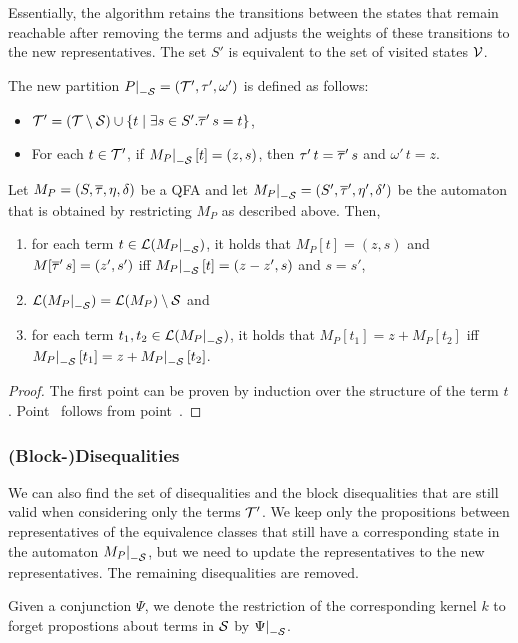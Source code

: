 Essentially, the algorithm retains the transitions between the states that remain reachable after removing the terms and adjusts the weights of these transitions to the new representatives.
The set $S'$ is equivalent to the set of visited states $\mathcal{V}$.

The new partition $\restr{P}{-\Set} = (\T', \tau', \omega')$ is defined as follows:
\begin{itemize}
    \item $\mathcal{T}' = (\mathcal{T} \setminus \mathcal{S}) \cup \{t \mid \exists s \in S' . \overline{\tau}'\,s = t\}$,
    \item For each $t \in \mathcal{T}'$, if $\restr{M_P}{-\Set}[t] = (z, s)$, then $\tau'\,t = \overline{\tau}'\,s$ and $\omega'\,t = z$.
\end{itemize}

\begin{theorem}\label{restriction}
    Let $M_P = (S, \overline{\tau}, \eta, \delta)$ be a QFA and let $\restr{M_P}{-\Set} = (S', \otau', \eta', \delta')$ be the automaton that is obtained by restricting $M_P$ as described above.
    Then,
    \begin{enumerate}
        \item\label{item:lemma-restriction} for each term $t \in \L(\restr{M_P}{-\Set})$, it holds that $M_P[t] = (z, s)$ and $M[\overline{\tau}'\,s] = (z', s')$ iff $\restr{M_P}{-\Set}[t] = (z - z', s)$ and $s = s'$,
        \item $\L(\restr{M_P}{-\Set}) = \L(M_P) \setminus \Set$ and
              \item\label{item:correctness-restriction} for each term $t_1, t_2 \in \L(\restr{M_P}{-\Set})$, it holds that $M_P[t_1] = z + M_P[t_2]$ iff $\restr{M_P}{-\Set}[t_1] = z + \restr{M_P}{-\Set}[t_2]$.
    \end{enumerate}
\end{theorem}
\begin{proof}
    The first point can be proven by induction over the structure of the term $t$.
    Point~ follows from point~.
\end{proof}
\subsubsection{(Block-)Disequalities}
We can also find the set of disequalities and the block disequalities that are still valid when considering only the terms $\mathcal{T}'$.
We keep only the propositions between representatives of the equivalence classes that
still have a corresponding state in the automaton $\restr{M_P}{-\Set}$, but we need to update the representatives to the new representatives.
The remaining disequalities are removed.

Given a conjunction $\Psi$, we denote the restriction of the corresponding kernel $k$ to forget propostions about terms in $\mathcal{S}$ by $\restr{\Psi}{-\Set}$.
